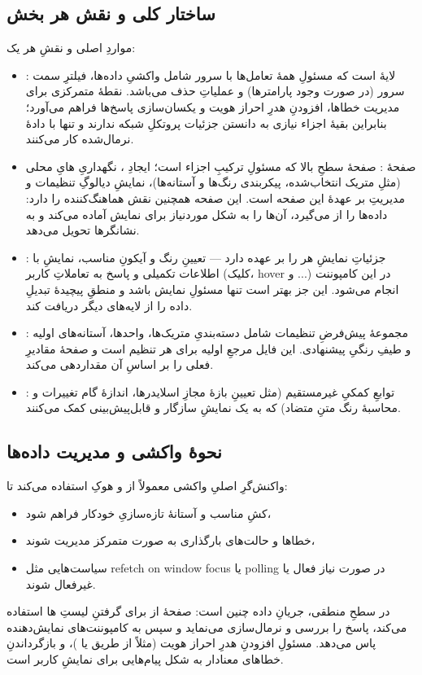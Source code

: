 \subsection{ساختار کلی و نقش هر بخش}
مواردِ اصلی و نقشِ هر یک:
\begin{itemize}
  \item \textbf{}: لایهٔ  است که مسئولِ همهٔ تعامل‌ها با سرور شامل واکشیِ داده‌ها، فیلترِ سمت سرور (در صورت وجود پارامترها) و عملیاتِ حذف می‌باشد.  نقطهٔ متمرکزی برای مدیریت خطاها، افزودنِ هدرِ احراز هویت و یکسان‌سازی پاسخ‌ها فراهم می‌آورد؛ بنابراین بقیهٔ اجزاء نیازی به دانستن جزئیات پروتکلِ شبکه ندارند و تنها با دادهٔ نرمال‌شده کار می‌کنند.
  \item صفحهٔ \textbf{}: صفحهٔ سطحِ بالا که مسئولِ ترکیبِ اجزاء است؛ ایجادِ ، نگهداریِ هایِ محلی (مثلِ متریک انتخاب‌شده، پیکربندی رنگ‌ها و آستانه‌ها)، نمایشِ دیالوگِ تنظیمات و مدیریتِ  بر عهدهٔ این صفحه است. این صفحه همچنین نقش هماهنگ‌کننده را دارد: داده‌ها را از  می‌گیرد، آن‌ها را به شکل موردنیاز برای نمایش آماده می‌کند و به نشانگرها تحویل می‌دهد.
  \item \textbf{}: جزئیاتِ نمایشِ هر  را بر عهده دارد — تعیینِ رنگ و آیکونِ مناسب، نمایشِ  با اطلاعات تکمیلی و پاسخ به تعاملاتِ کاربر (کلیک، hover و ...) در این کامپوننت انجام می‌شود. این جز بهتر است تنها مسئولِ نمایش باشد و منطقِ پیچیدهٔ تبدیلِ داده را از لایه‌های دیگر دریافت کند.
  \item \textbf{}: مجموعهٔ پیش‌فرضِ تنظیمات شامل دسته‌بندیِ متریک‌ها، واحدها، آستانه‌های اولیه و طیفِ رنگیِ پیشنهادی. این فایل مرجعِ اولیه برای هر تنظیم است و صفحهٔ  مقادیرِ فعلی را بر اساسِ آن مقداردهی می‌کند.
  \item \textbf{}: توابعِ کمکیِ غیرمستقیم (مثل تعیینِ بازهٔ مجازِ اسلایدرها، اندازهٔ گام تغییرات و محاسبهٔ رنگ متنِ متضاد) که به یک نمایشِ سازگار و قابل‌پیش‌بینی کمک می‌کنند.
\end{itemize}

\subsection{نحوهٔ واکشی و مدیریت داده‌ها}
واکنش‌گرِ اصلیِ واکشی معمولاً از  و هوکِ  استفاده می‌کند تا:
\begin{itemize}
  \item کشِ مناسب و آستانهٔ تازه‌سازیِ خودکار فراهم شود،
  \item خطاها و حالت‌های بارگذاری به صورت متمرکز مدیریت شوند،
  \item سیاست‌هایی مثل refetch on window focus یا polling در صورت نیاز فعال یا غیرفعال شوند.
\end{itemize}
در سطحِ منطقی، جریانِ داده چنین است: صفحهٔ  از  برای گرفتنِ لیستِ ها استفاده می‌کند، پاسخ را بررسی و نرمال‌سازی می‌نماید و سپس به کامپوننت‌های نمایش‌دهنده پاس می‌دهد.  مسئولِ افزودنِ هدرِ احراز هویت (مثلاً از طریق  یا )، و بازگرداندنِ خطاهای معنادار به شکل پیام‌هایی برای نمایشِ کاربر است.


